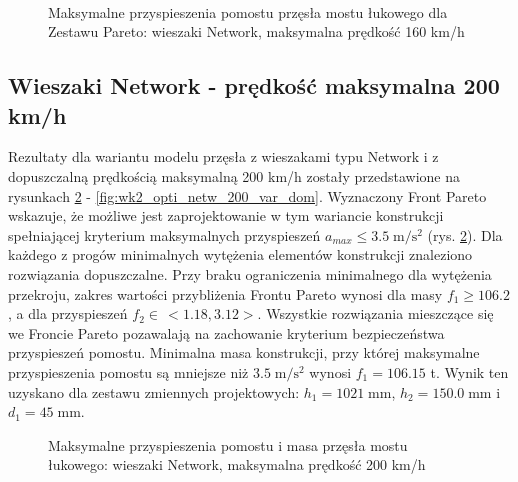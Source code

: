 \begin{figure}[hbt!]
	\centering
	\\
	\captionsetup{justification=centering}
	\caption{Maksymalne przyspieszenia pomostu przęsła mostu łukowego dla Zestawu Pareto: wieszaki Network, maksymalna prędkość 160 km/h}
	\label{fig:wk2_opti_netw_160_var_dom}
\end{figure}


\clearpage


\subsection{Wieszaki Network - prędkość maksymalna 200 km/h}

Rezultaty dla wariantu modelu przęsła z wieszakami typu Network i z dopuszczalną prędkością maksymalną 200 km/h zostały przedstawione na rysunkach \ref{fig:wk2_opti_netw_200_all} - \ref{fig:wk2_opti_netw_200_var_dom}. Wyznaczony Front Pareto wskazuje, że możliwe jest zaprojektowanie w tym wariancie konstrukcji spełniającej kryterium maksymalnych przyspieszeń $a_{max}\le 3.5\;\mathrm{m/s^2}$ (rys. \ref{fig:wk2_opti_netw_200_all}). Dla każdego z progów minimalnych wytężenia elementów konstrukcji znaleziono rozwiązania dopuszczalne. Przy braku ograniczenia minimalnego dla wytężenia przekroju, zakres wartości przybliżenia Frontu Pareto wynosi dla masy $f_1 \ge 106.2$, a dla przyspieszeń $f_2 \in\,<1.18,3.12>$. Wszystkie rozwiązania mieszczące się we Froncie Pareto pozawalają na zachowanie kryterium bezpieczeństwa przyspieszeń pomostu. Minimalna masa konstrukcji, przy której maksymalne przyspieszenia pomostu są mniejsze niż $3.5\;\mathrm{m/s^2}$ wynosi $f_1 = 106.15$ t. Wynik ten uzyskano dla zestawu zmiennych projektowych: $h_1 = 1021\;\mathrm{mm}$, $h_2 = 150.0\;\mathrm{mm}$ i $d_1 = 45\;\mathrm{mm}$.


\begin{figure}[hbt!]
	\centering
	\captionsetup{justification=centering}
	\caption{Maksymalne przyspieszenia pomostu i masa przęsła mostu łukowego: wieszaki Network, maksymalna prędkość 200 km/h}
	\label{fig:wk2_opti_netw_200_all}
\end{figure}

